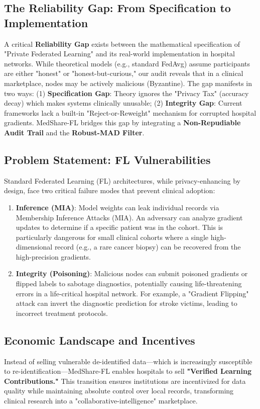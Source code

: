 \documentclass[10pt, a4paper, twocolumn]{article}
\begin{document}
\subsection{The Reliability Gap: From Specification to Implementation}
A critical \textbf{Reliability Gap} exists between the mathematical specification of "Private Federated Learning" and its real-world implementation in hospital networks. While theoretical models (e.g., standard FedAvg) assume participants are either "honest" or "honest-but-curious," our audit reveals that in a clinical marketplace, nodes may be actively malicious (Byzantine). The gap manifests in two ways: (1) \textbf{Specification Gap}: Theory ignores the "Privacy Tax" (accuracy decay) which makes systems clinically unusable; (2) \textbf{Integrity Gap}: Current frameworks lack a built-in "Reject-or-Reweight" mechanism for corrupted hospital gradients. MedShare-FL bridges this gap by integrating a \textbf{Non-Repudiable Audit Trail} and the \textbf{Robust-MAD Filter}.

\subsection{Problem Statement: FL Vulnerabilities}
Standard Federated Learning (FL) architectures, while privacy-enhancing by design, face two critical failure modes that prevent clinical adoption:
\begin{enumerate}
    \item \textbf{Inference (MIA)}: Model weights can leak individual records via Membership Inference Attacks (MIA). An adversary can analyze gradient updates to determine if a specific patient was in the cohort. This is particularly dangerous for small clinical cohorts where a single high-dimensional record (e.g., a rare cancer biopsy) can be recovered from the high-precision gradients.
    \item \textbf{Integrity (Poisoning)}: Malicious nodes can submit poisoned gradients or flipped labels to sabotage diagnostics, potentially causing life-threatening errors in a life-critical hospital network. For example, a "Gradient Flipping" attack can invert the diagnostic prediction for stroke victims, leading to incorrect treatment protocols.
\end{enumerate}

\subsection{Economic Landscape and Incentives}
Instead of selling vulnerable de-identified data—which is increasingly susceptible to re-identification—MedShare-FL enables hospitals to sell \textbf{"Verified Learning Contributions."} This transition ensures institutions are incentivized for data quality while maintaining absolute control over local records, transforming clinical research into a "collaborative-intelligence" marketplace.
\end{document}
